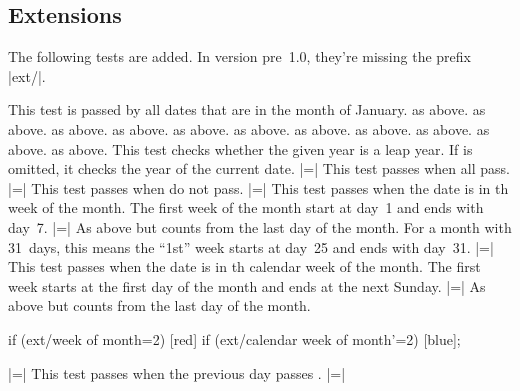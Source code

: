 \begin{multicols}{2}

\subsection{Extensions}

The following tests are added.
In version pre~1.0, they're missing the prefix |ext/|.
\begin{itemize}
 This test is passed by all dates that are in the month of January.
 as above.
 as above.
 as above.
 as above.
 as above.
 as above.
 as above.
 as above.
 as above.
 as above.
 as above.
    This test checks whether the given year is a leap year. If
     is omitted, it checks the year of the current date.
|=|
    This test passes when all  pass.
|=|
    This test passes when  do not pass.
|=|
    This test passes when the date is in th week of the month.
    The first week of the month start at day~1 and ends with day~7.
|=|
    As above but counts from the last day of the month.
    For a month with 31~days, this means the ``1st'' week starts at day~25 and ends with day~31.
|=|
    This test passes when the date is in th calendar week of the month.
    The first week starts at the first day of the month and ends at the next Sunday.
|=|
    As above but counts from the last day of the month.
\begin{codeexample}[width=5cm,preamble=\usetikzlibrary{ext.calendar-plus}]
\tikz
  \calendar[
    dates=2022-10-01 to 2022-10-31,
    week list]
    if (ext/week of month=2)           [red]
    if (ext/calendar week of month'=2) [blue];
\end{codeexample}
|=|
    This test passes when the previous day passes .
|=|

\end{itemize}
\end{multicols}
